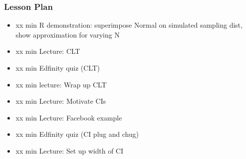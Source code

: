 

\begin{frame}
\frametitle{Lesson Plan}
\begin{itemize}
    \item xx min R demonstration: superimpose Normal on simulated sampling dist, show approximation for varying N 
    \item xx min Lecture: CLT 
    \item xx min Edfinity quiz (CLT)
    \item xx min lecture: Wrap up CLT

    \item xx min Lecture: Motivate CIs
    \item xx min Lecture: Facebook example
    \item xx min Edfinity quiz (CI plug and chug)
    \item xx min Lecture: Set up width of CI
    
\end{itemize}
\end{frame}
        


